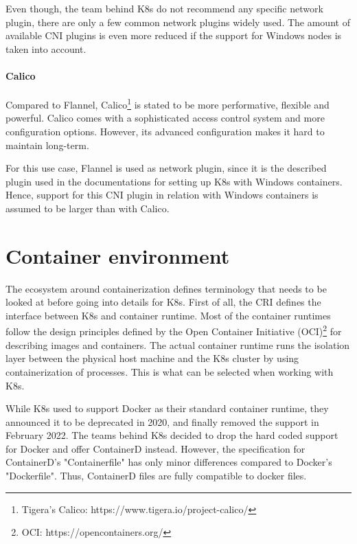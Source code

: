 Even though, the team behind \ac{K8s} do not recommend any specific network plugin, there are only a few common network plugins widely used. The amount of available \ac{CNI} plugins is even more reduced if the support for \ac{Windows} nodes is taken into account.

\paragraph*{Calico}
Compared to Flannel, Calico\footnote{Tigera's Calico: https://www.tigera.io/project-calico/} is stated to be more performative, flexible and powerful\cite{SuseRancherCommunity.20230212,Tigera.20230210}. Calico comes with a sophisticated access control system\cite{Tigera.20230210} and more configuration options. However, its advanced configuration makes it hard to maintain long-term.

For this use case, Flannel is used as network plugin, since it is the described plugin used in the documentations for setting up \ac{K8s} with \ac{Windows} containers\cite{GitHubKubernetesSIGWindowsTools.20230213,Kubernetes.20220419}. Hence, support for this \ac{CNI} plugin in relation with \ac{Windows} containers is assumed to be larger than with Calico.

\section{Container environment}
The ecosystem around containerization defines terminology that needs to be looked at before going into details for \ac{K8s}. First of all, the \acf{CRI} defines the interface between \ac{K8s} and container runtime. Most of the container runtimes follow the design principles defined by the Open Container Initiative (OCI)\footnote{OCI: https://opencontainers.org/} for describing images and containers. The actual container runtime runs the isolation layer between the physical host machine and the \ac{K8s} cluster by using containerization of processes. This is what can be selected when working with \ac{K8s}.

While \ac{K8s} used to support Docker as their standard container runtime, they announced it to be deprecated in 2020, and finally removed the support in February 2022\cite{Kubernetes.2020, Kubernetes.2022}. The teams behind \ac{K8s} decided to drop the hard coded support for Docker and offer ContainerD instead.
However, the specification for ContainerD's "Containerfile" has only minor differences compared to Docker's "Dockerfile". Thus, ContainerD files are fully compatible to docker files.

